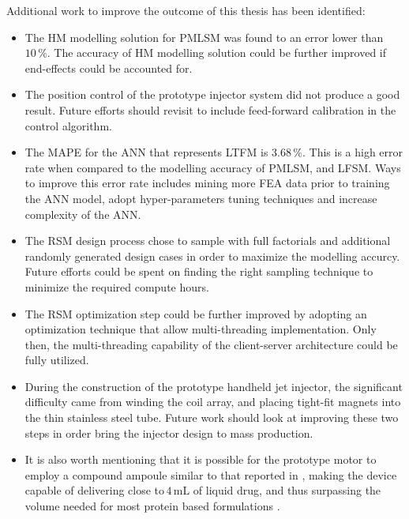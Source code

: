     Additional work to improve the outcome of this thesis has been identified:
    
    \begin{itemize}
        \item The \acs{HM} modelling solution for \acs{PMLSM} was found to an error lower than $10\,\%$. The accuracy of \acs{HM} modelling solution could be further improved if end-effects could be accounted for.
        \item The position control of the prototype injector system did not produce a good result. Future efforts should revisit to include feed-forward calibration in the control algorithm. 
        \item The \acf{MAPE} for the \acs{ANN} that represents \acs{LTFM} is $3.68\,\%$. This is a high error rate when compared to the modelling accuracy of \acs{PMLSM}, and \acs{LFSM}. Ways to improve this error rate includes mining more \acf{FEA} data prior to training the \acs{ANN} model, adopt hyper-parameters tuning techniques and increase complexity of the \acs{ANN}.
        \item The \acs{RSM} design process chose to sample with full factorials and additional randomly generated design cases in order to maximize the modelling accurcy. Future efforts could be spent on finding the right sampling technique to minimize the required compute hours.
        \item The \acs{RSM} optimization step could be further improved by adopting an optimization technique that allow multi-threading implementation. Only then, the multi-threading capability of the client-server architecture could be fully utilized.   
        \item During the construction of the prototype handheld jet injector, the significant difficulty came from winding the coil array, and placing tight-fit magnets into the thin stainless steel tube. Future work should look at improving these two steps in order bring the injector design to mass production.
        \item It is also worth mentioning that it is possible for the prototype motor to employ a compound ampoule similar to that reported in \cite{Ruddy2015a,McKeage2018}, making the device capable of delivering close to\,$4\,\mathrm{mL}$ of liquid drug, and thus surpassing the volume needed for most protein based formulations \cite{Hogan2015}.
    \end{itemize}


